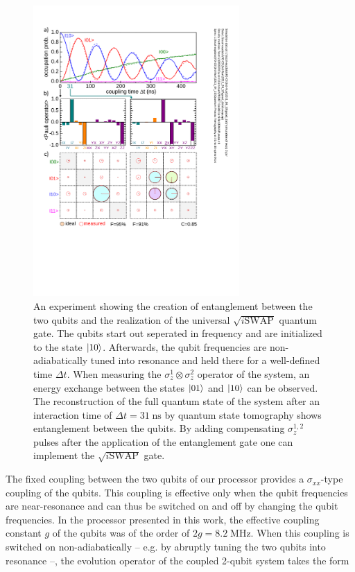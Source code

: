 \begin{figure}
	\centering
		\includegraphics[width=0.7\textwidth]{./material/papers/iswap/submission1/Dewes_Figure2}
	\caption[Generating entangled 2-qubit states by swapping interaction]{An experiment showing the creation of entanglement between the two qubits and the realization of the universal $\sqrt{i\mathrm{SWAP}}$ quantum gate. The qubits start out seperated in frequency and are initialized to the state $\left| 10 \right>$. Afterwards, the qubit frequencies are non-adiabatically tuned into resonance and held there for a well-defined time $\Delta t$. When measuring the $\sigma_z^1 \otimes \sigma_z^2$ operator of the system, an energy exchange between the states $\left| 01 \right>$ and $\left| 10 \right>$ can be observed. The reconstruction of the full quantum state of the system after an interaction time of $\Delta t = 31 \; \mathrm{ns} $ by quantum state tomography shows entanglement between the qubits. By adding compensating $\sigma_z^{1,2}$ pulses after the application of the entanglement gate one can implement the $\sqrt{i\mathrm{SWAP}}$ gate.}
	\label{fig:iSwap2}
\end{figure}

The fixed coupling between the two qubits of our processor provides a $\sigma_{xx}$-type coupling of the qubits. This coupling is effective only when the qubit frequencies are near-resonance and can thus be switched on and off by changing the qubit frequencies. In the processor presented in this work, the effective coupling constant $g$ of the qubits was of the order of $2g = 8.2 \; \mathrm{MHz}$. When this coupling is switched on non-adiabatically -- e.g. by abruptly tuning the two qubits into resonance --, the evolution operator of the coupled 2-qubit system takes the form

